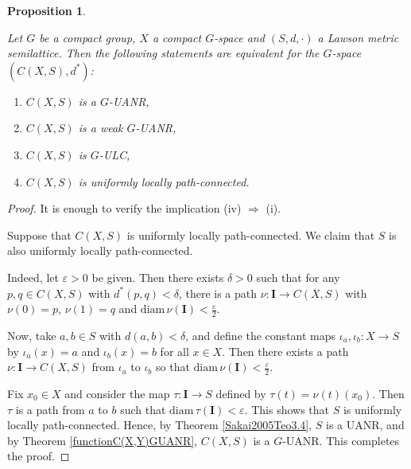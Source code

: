 \documentclass[12pt]{amsart}
\newtheorem{proposition}[theorem]{Proposition}
\theoremstyle{definition}
\newcommand{\I}{\textbf{I}}
\begin{document}
	
	\begin{proposition} \label{EquivaC(X,S)equivariant}
		\rm{Let $G$ be a compact group, $X$ a compact $G$-space and $(S,d,\cdot)$ a Lawson metric semilattice. Then the following statements are equivalent for the $G$-space $(C(X,S),d^*)$:
			
			\begin{enumerate}
				\item [(i)] $C(X,S)$ is a $G$-UANR,
				\item [(ii)] $C(X,S)$ is a weak $G$-UANR,
				\item [(iii)] $C(X,S)$ is $G$-ULC,
				\item [(iv)] $C(X,S)$ is uniformly locally path-connected.
		\end{enumerate}}
		
	\end{proposition}
	
	\begin{proof}
		It is enough to verify the implication (iv) $\Rightarrow$ (i). 
		
		Suppose that $C(X,S)$ is uniformly locally path-connected. We claim that $S$ is also uniformly locally path-connected. 
		
		Indeed, let $\varepsilon>0$ be given. Then there exists $\delta>0$ such that for any $p,q\in C(X,S)$ with $d^*(p,q)<\delta$, there is a path $\nu: \I\rightarrow C(X,S)$ with $\nu(0)=p$, $\nu(1)=q$ and $\text{diam}\, \nu(\I)<\frac{\varepsilon}{2}$. 
		
		Now, take $a,b\in S$ with $d(a,b)<\delta$, and define the constant maps $\iota_a,\iota_b:X\rightarrow S$ by $\iota_a(x)=a$ and $\iota_b(x)=b$ for all $x\in X$. Then there exists a path $\nu:\I\rightarrow C(X,S)$ from $\iota_a$ to $\iota_b$ so that $\text{diam}\, \nu(\I)<\frac{\varepsilon}{2}$. 
		
		Fix $x_0\in X$ and consider the map $\tau: \I\rightarrow S$ defined by $\tau(t)=\nu(t)(x_0)$. Then $\tau$ is a path from $a$ to $b$ such that $\text{diam}\, \tau(\I)<\varepsilon$. This shows that $S$ is uniformly locally path-connected. Hence, by Theorem \ref{Sakai2005Teo3.4}, $S$ is a UANR, and by Theorem \ref{functionC(X,Y)GUANR}, $C(X,S)$ is a $G$-UANR. This completes the proof.
	\end{proof}
	
	
	
	
\end{document}
